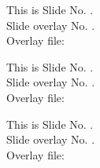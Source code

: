 \documentclass{article}
\begin{document}
\begin{slide}\Huge\color{orange}\centering
This is  Slide No. \theslide.\\
\color{blue}\large Slide overlay No. \theslideoverlay.\\
\color{red} Overlay file: \makeatletter\@overlay\makeatother
\end{slide}

\begin{slide}\Huge\color{orange}\centering
This is  Slide No. \theslide.\\
\color{blue}\large Slide overlay No. \theslideoverlay.\\
\color{red} Overlay file: \makeatletter\@overlay\makeatother
\end{slide}


\begin{slide}\Huge\color{orange}\centering
This is  Slide No. \theslide.\\
\color{blue}\large Slide overlay No. \theslideoverlay.\\
\color{red} Overlay file: \makeatletter\@overlay\makeatother
\end{slide}
\end{document}
